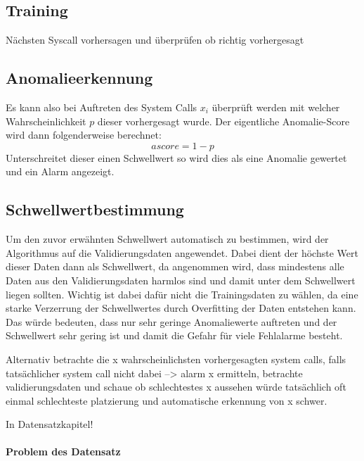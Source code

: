         \subsection{Training}\label{sec:Training}
            Nächsten Syscall vorhersagen und überprüfen ob richtig vorhergesagt
        \subsection{Anomalieerkennung}\label{sec:Anomalieerkennung}
            Es kann also bei Auftreten des System Calls $x_i$ überprüft werden mit welcher Wahrscheinlichkeit $p$ dieser vorhergesagt wurde.
            Der eigentliche Anomalie-Score wird dann folgenderweise berechnet:
            \begin{equation}
                ascore = 1 - p
            \end{equation}
            Unterschreitet dieser einen Schwellwert so wird dies als eine Anomalie gewertet und ein Alarm angezeigt.
        \subsection{Schwellwertbestimmung}
            Um den zuvor erwähnten Schwellwert automatisch zu bestimmen, wird der Algorithmus auf die Validierungsdaten angewendet. 
            Dabei dient der höchste Wert dieser Daten dann als Schwellwert, da angenommen wird, dass mindestens alle Daten aus den Validierungsdaten harmlos sind und damit unter dem Schwellwert liegen sollten.
            Wichtig ist dabei dafür nicht die Trainingsdaten zu wählen, da eine starke Verzerrung der Schwellwertes durch Overfitting der Daten entstehen kann. 
            Das würde bedeuten, dass nur sehr geringe Anomaliewerte auftreten und der Schwellwert sehr gering ist und damit die Gefahr für viele Fehlalarme besteht.

            Alternativ betrachte die x wahrscheinlichsten vorhergesagten system calls, falls tatsächlicher system call nicht dabei --> alarm
            x ermitteln, betrachte validierungsdaten und schaue ob schlechtestes x aussehen würde
            tatsächlich oft einmal schlechteste platzierung und automatische erkennung von x schwer.

            {\color{red} In Datensatzkapitel!}
            \paragraph{Problem des Datensatz}

